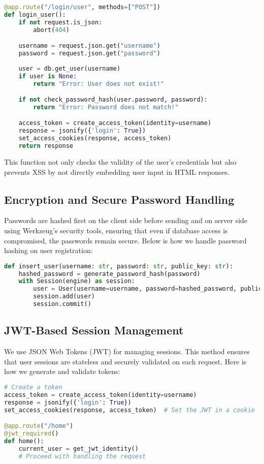 \documentclass{article}
\begin{document}
\begin{lstlisting}[language=Python]
@app.route("/login/user", methods=["POST"])
def login_user():
    if not request.is_json:
        abort(404)

    username = request.json.get("username")
    password = request.json.get("password")
    
    user = db.get_user(username)
    if user is None:
        return "Error: User does not exist!"

    if not check_password_hash(user.password, password):
        return "Error: Password does not match!"

    access_token = create_access_token(identity=username)
    response = jsonify({'login': True})
    set_access_cookies(response, access_token)
    return response
\end{lstlisting}

This function not only checks the validity of the user’s credentials but also prevents XSS by not directly embedding user input in HTML responses.

\subsection{Encryption and Secure Password Handling}
Passwords are hashed first on the client side before sending and on server side using Werkzeug’s security tools, ensuring that even if database access is compromised, the passwords remain secure. Below is how we handle password hashing on user registration:

\begin{lstlisting}[language=Python]
def insert_user(username: str, password: str, public_key: str):
    hashed_password = generate_password_hash(password)
    with Session(engine) as session:
        user = User(username=username, password=hashed_password, public_key=public_key)
        session.add(user)
        session.commit()
\end{lstlisting}

\subsection{JWT-Based Session Management}
We use JSON Web Tokens (JWT) for managing sessions. This method ensures that user sessions are stateless and securely validated on each request. Here is how we generate and validate tokens:

\begin{lstlisting}[language=Python]
# Create a token
access_token = create_access_token(identity=username)
response = jsonify({'login': True})
set_access_cookies(response, access_token)  # Set the JWT in a cookie

@app.route("/home")
@jwt_required()
def home():
    current_user = get_jwt_identity()
    # Proceed with handling the request
\end{lstlisting}
\end{document}
